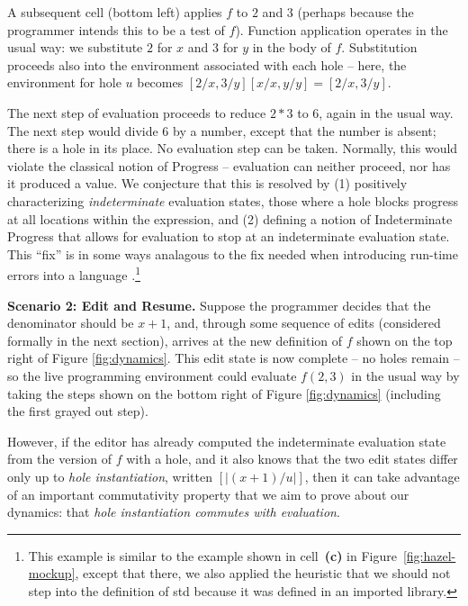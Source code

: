 A subsequent cell (bottom left) applies $f$ to $2$ and $3$ (perhaps because the programmer intends this to be a test of $f$). Function application operates in the usual way: 
we substitute $2$ for $x$ and $3$ for $y$ in the body of $f$. Substitution proceeds also into the environment associated with each hole -- here, the environment for hole $u$ becomes $[2/x, 3/y][x/x, y/y] = [2/x, 3/y]$.

The next step of evaluation proceeds to reduce $2 * 3$ to $6$, again in the usual way.
%
The next step would divide $6$ by a number, except that the number is
absent; there is a hole in its place. No evaluation step can be taken. 
%
Normally, this would violate the classical notion of Progress -- 
evaluation can neither proceed, nor has it produced a value. We conjecture that this is
resolved by (1) positively characterizing \emph{indeterminate} 
evaluation states, those where a hole blocks progress at all locations
within the expression, and (2) defining
a notion of Indeterminate Progress that allows for evaluation to stop at an 
indeterminate evaluation state. This ``fix'' is in some ways analagous to the fix needed when introducing 
run-time errors into a language \cite{pfpl}.\footnote{%
This example is similar to the example shown in cell~\textbf{(c)} in
Figure~\ref{fig:hazel-mockup}, except that there, we also applied
the heuristic that we should not step
into the definition of {std} because it was defined in an imported library.}

\vspace{0.25ex}
\noindent\textbf{Scenario 2: Edit and Resume.}
Suppose the programmer decides that the denominator should
be $x+1$, and, through some sequence of edits (considered formally in the next section), arrives at 
the new definition of $f$ shown on the top right of Figure \ref{fig:dynamics}. This edit state is now complete -- no holes remain -- so the live programming environment 
could evaluate $f(2, 3)$ in the usual way by taking the steps shown on
the bottom right of Figure \ref{fig:dynamics} (including the first
grayed out step).

However, if the editor has already computed the indeterminate evaluation 
state from the version of $f$ with a hole, and it also knows that the 
two edit states differ only up to \emph{hole instantiation}, written 
$[\!| (x+1) / u
|\!]$, then it can take advantage of an important commutativity property that we aim 
to prove about our dynamics: that 
\emph{hole instantiation commutes with evaluation}. 

